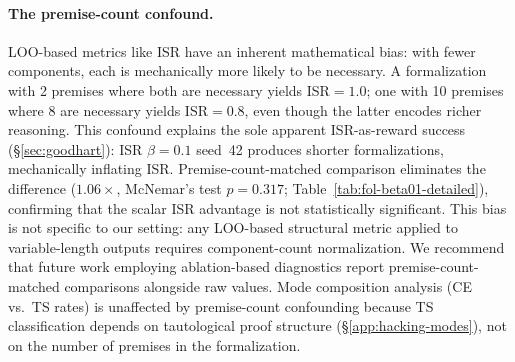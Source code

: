 \paragraph{The premise-count confound.}
\label{app:premise-count}
LOO-based metrics like ISR have an inherent mathematical bias: with fewer components, each is mechanically more likely to be necessary.
A formalization with 2 premises where both are necessary yields ISR${=}1.0$; one with 10 premises where 8 are necessary yields ISR${=}0.8$, even though the latter encodes richer reasoning.
This confound explains the sole apparent ISR-as-reward success (\S\ref{sec:goodhart}): ISR $\beta{=}0.1$ seed~42 produces shorter formalizations, mechanically inflating ISR.
Premise-count-matched comparison eliminates the difference ($1.06\times$, McNemar's test $p{=}0.317$; Table~\ref{tab:fol-beta01-detailed}), confirming that the scalar ISR advantage is not statistically significant.
This bias is not specific to our setting: any LOO-based structural metric applied to variable-length outputs requires component-count normalization.
We recommend that future work employing ablation-based diagnostics report premise-count-matched comparisons alongside raw values.
Mode composition analysis (CE vs.\ TS rates) is unaffected by premise-count confounding because TS classification depends on tautological proof structure (\S\ref{app:hacking-modes}), not on the number of premises in the formalization.

\begin{table}[h]
\centering
{}
\caption{Mode composition by premise-count bin (seed 42). TS hacking is concentrated in the 4--6 premise range and absent for ${\geq}7$ premises, indicating a mechanistic complexity threshold rather than a statistical confound.}
\label{tab:premise-bin-modes}
\end{table}


